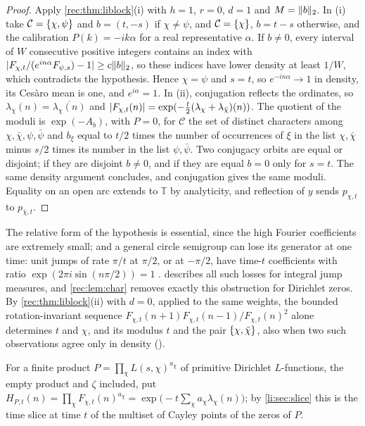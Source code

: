\begin{proof}
Apply \cref{rec:thm:liblock}(i) with $h=1$, $r=0$, $d=1$ and $M=\lVert b\rVert_2$. In (i) take $\mathcal C=\{\chi,\psi\}$ and
$b=(t,-s)$ if $\chi\ne\psi$, and $\mathcal C=\{\chi\}$, $b=t-s$ otherwise, and the calibration $P(k)=-ik\alpha$ for a real
representative $\alpha$. If $b\ne0$, every interval of $W$ consecutive positive integers contains an index with
$\lvert F_{\chi,t}/(e^{in\alpha}F_{\psi,s})-1\rvert\ge c\lVert b\rVert_2$, so these indices have lower density at least $1/W$, which contradicts
the hypothesis. Hence $\chi=\psi$ and $s=t$, so $e^{-in\alpha}\to1$ in density, its Ces\`aro mean is one, and $e^{i\alpha}=1$.
In (ii), conjugation reflects the ordinates, so $\lambda_{\bar\chi}(n)=\overline{\lambda_\chi(n)}$ and
$\lvert F_{\chi,t}(n)\rvert=\exp(-\frac t2(\lambda_\chi+\lambda_{\bar\chi})(n))$. The quotient of the moduli is $\exp(-A_b)$, with $P=0$, for
$\mathcal C$ the set of distinct characters among $\chi,\bar\chi,\psi,\bar\psi$ and $b_\xi$ equal to $t/2$ times the number of
occurrences of $\xi$ in the list $\chi,\bar\chi$ minus $s/2$ times its number in the list $\psi,\bar\psi$. Two conjugacy orbits
are equal or disjoint; if they are disjoint $b\ne0$, and if they are equal $b=0$ only for $s=t$. The same density
argument concludes, and conjugation gives the same moduli. Equality on an
open arc extends to $\mathbb T$ by analyticity, and reflection of $y$ sends $p_{\chi,t}$ to $p_{\bar\chi,t}$.
\end{proof}

The relative form of the hypothesis is essential, since the high Fourier coefficients are extremely
small; and a general circle semigroup can lose its generator at one time: unit jumps of rate $\pi/t$ at
$\pi/2$, or at $-\pi/2$, have time-$t$ coefficients with ratio $\exp(2\pi i\sin(n\pi/2))=1$ \cite{HasebeHotta2022Additive}.
 describes all such losses for integral jump measures, and \cref{rec:lem:char} removes exactly
this obstruction for Dirichlet zeros. By \cref{rec:thm:liblock}(ii) with $d=0$, applied to the same weights, the bounded
rotation-invariant sequence $F_{\chi,t}(n+1)F_{\chi,t}(n-1)/F_{\chi,t}(n)^2$ alone determines $t$ and $\chi$, and its modulus $t$
and the pair $\{\chi,\bar\chi\}$, also when two such observations agree only in density (\stG).

For a finite product $P=\prod_\chi L(s,\chi)^{a_\chi}$ of primitive Dirichlet $L$-functions, the empty product and
$\zeta$ included, put $H_{P,t}(n)=\prod_\chi F_{\chi,t}(n)^{a_\chi}=\exp\bigl(-t\sum_\chi a_\chi\lambda_\chi(n)\bigr)$; by
\cref{li:sec:slice} this is the time slice at time $t$ of the multiset of Cayley points of the zeros of $P$.

